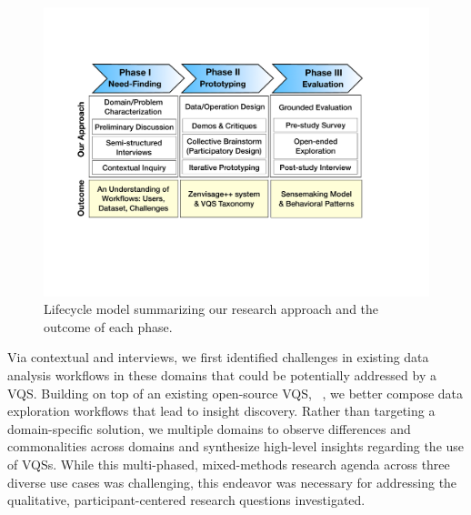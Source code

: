  \begin{figure}
    \centering
    \includegraphics[width=0.85\linewidth]{figures/methodFlowchart.pdf}
    \caption{Lifecycle model summarizing our research approach and the outcome of each phase.}
    \label{methodFlowchart}
    \vspace*{-20pt}
  \end{figure}
 \par {} Via contextual  and interviews, we first identified challenges in existing data analysis workflows in these domains that could be potentially addressed by a VQS. Building on top of an existing open-source VQS, \zv~\cite{Siddiqui2017,Siddiqui2017VLDB}, we  better compose data exploration workflows that lead to insight discovery. Rather than targeting a domain-specific solution, we  multiple domains to observe differences and commonalities across domains and synthesize high-level insights regarding the use of VQSs. While  this multi-phased, mixed-methods research agenda across three diverse use cases was challenging, this endeavor was necessary for addressing the qualitative, participant-centered research questions investigated.%
